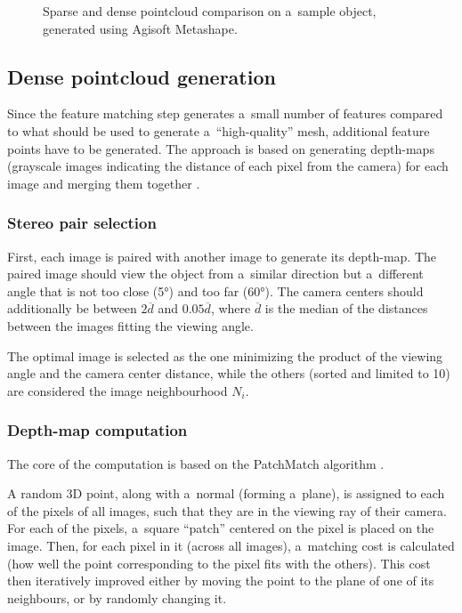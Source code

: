 \begin{figure}[h]
	\centering
	\hfill
	\caption{Sparse and dense pointcloud comparison on a~sample object, generated using Agisoft Metashape.}%
\end{figure}

\subsection{Dense pointcloud generation}
Since the feature matching step generates a~small number of features compared to what should be used to generate a~``high-quality'' mesh, additional feature points have to be generated.
The approach is based on generating depth-maps (grayscale images indicating the distance of each pixel from the camera) for each image and merging them together \cite{shen2013accurate}.

\subsubsection{Stereo pair selection}
First, each image is paired with another image to generate its depth-map.
The paired image should view the object from a~similar direction but a~different angle that is not too close (\ang{5}) and too far (\ang{60}).
The camera centers should additionally be between $2 \overline{d}$ and $0.05 \overline{d}$, where $\overline{d}$ is the median of the distances between the images fitting the viewing angle.

The optimal image is selected as the one minimizing the product of the viewing angle and the camera center distance, while the others (sorted and limited to 10) are considered the image neighbourhood $N_i$.

\subsubsection{Depth-map computation}
The core of the computation is based on the PatchMatch algorithm \cite{barnes2009PAR}.

A random 3D point, along with a~normal (forming a~plane), is assigned to each of the pixels of all images, such that they are in the viewing ray of their camera.
For each of the pixels, a~square ``patch'' centered on the pixel is placed on the image.
Then, for each pixel in it (across all images), a~matching cost is calculated (how well the point corresponding to the pixel fits with the others).
This cost then iteratively improved either by moving the point to the plane of one of its neighbours, or by randomly changing it.


